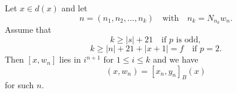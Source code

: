 Let $x \in d(x)$ and let
$$n = (n_1, n_2, \dots, n_k) \quad \text{with} \quad n_k = N_{n_k} w_n.$$
Assume that
$$k \ge |s| + 21 \quad \text{if } p \text{ is odd},$$
$$k \ge |n| + 21 + |x + 1| = f \quad \text{if } p = 2.$$
Then $[x, w_n]$ lies in $i^{n+1}$ for $1 \le i \le k$ and we have
$$(x, w_n) = [x_n, y_n]_B(x)$$
for such $n$.
